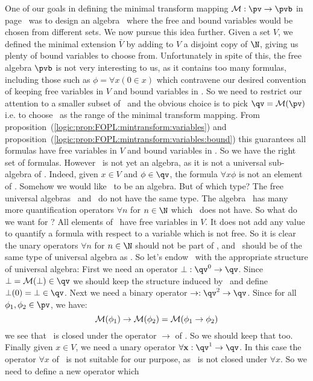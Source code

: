 One of our goals in defining the minimal transform mapping ${\cal
M}:\pv\to\pvb$ in
page~\pageref{logic:def:FOPL:mintransform:transform} was to design
an algebra \qv\ where the free and bound variables would be chosen
from different sets. We now pursue this idea further. Given a set
$V$, we defined the minimal extension $\bar{V}$ by adding to $V$ a
disjoint copy of $\N$, giving us plenty of bound variables to choose
from. Unfortunately in spite of this, the free algebra $\pvb$ is not
very interesting to us, as it contains too many formulas, including
those such as $\phi=\forall x(0\in x)$ which contravene our desired
convention of keeping free variables in $V$ and bound variables in
\N. So we need to restrict our attention to a smaller subset of
\pvb\ and the obvious choice is to pick $\qv={\cal M}(\pv)$ i.e. to
choose \qv\ as the range of the minimal transform mapping. From
proposition~(\ref{logic:prop:FOPL:mintransform:variables}) and
proposition~(\ref{logic:prop:FOPL:mintransform:variables:bound})
this guarantees all formulas have free variables in $V$ and bound
variables in \N. So we have the right set of formulas. However \qv\
is not yet an algebra, as it is not a universal sub-algebra of \pvb.
Indeed, given $x\in V$ and $\phi\in\qv$, the formula $\forall x\phi$
is not an element of \qv. Somehow we would like \qv\ to be an
algebra. But of which type? The free universal algebras \pv\ and
\pvb\ do not have the same type. The algebra \pvb\ has many more
quantification operators $\forall n$ for $n\in\N$ which \pv\ does
not have. So what do we want for \qv? All elements of \qv\ have free
variables in $V$. It does not add any value to quantify a formula
with respect to a variable which is not free. So it is clear the
unary operators $\forall n$ for $n\in\N$ should not be part of \qv,
and \qv\ should be of the same type of universal algebra as \pv. So
let's endow \qv\ with the appropriate structure of universal
algebra: First we need an operator $\bot:\qv^{0}\to\qv$. Since
$\bot={\cal M}(\bot)\in\qv$ we should keep the structure induced by
\pvb\ and define $\bot(0)=\bot\in\qv$. Next we need a binary
operator $\to:\qv^{2}\to\qv$. Since for all
$\phi_{1},\phi_{2}\in\pv$, we have:
    \[
    {\cal M}(\phi_{1})\to{\cal M}(\phi_{2})={\cal M}(\phi_{1}\to\phi_{2})
    \]
we see that \qv\ is closed under the operator $\to$ of \pvb. So we
should keep that too. Finally given $x\in V$, we need a unary
operator $\forall {\bf x}:\qv^{1}\to\qv$. In this case the operator
$\forall x$ of \pvb\ is not suitable for our purpose, as \qv\ is not
closed under $\forall x$. So we need to define a new operator which
